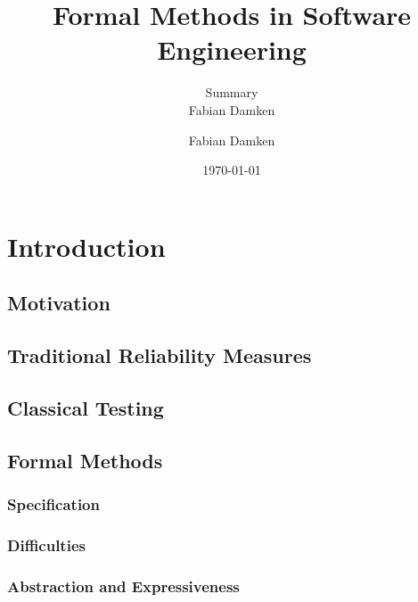 \documentclass[a4paper, 11pt, accentcolor = tud3b]{tudreport}
\title{Formal Methods in Software Engineering}
\subtitle{Summary \\ Fabian Damken}
\author{Fabian Damken}
\date{\today}
\begin{document}
    \maketitle
    \tableofcontents
    \listoftodos

    \chapter{Introduction} %

        \section{Motivation} %

        \section{Traditional Reliability Measures} %

        \section{Classical Testing} %

        \section{Formal Methods} %

            \subsection{Specification} %

            \subsection{Difficulties} %

            \subsection{Abstraction and Expressiveness} %
\end{document}

